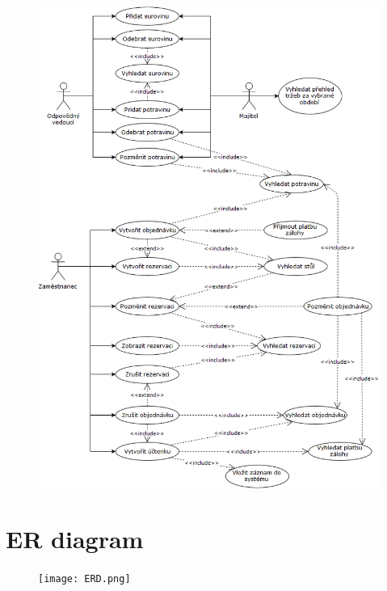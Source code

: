 \documentclass[11pt, a4paper]{article}[]
\begin{document}
	\begin{figure}[h]
	\begin{center} 
		\includegraphics[width=15cm]{use-case.png} 
		\label{fig:obr_use-case}
	\end{center}
	\end{figure}

	

	
	\section{ER diagram}

	\begin{figure}[h]
	\begin{center} 
		\texttt{[image: ERD.png]} 
		\label{fig:obr_ERD}
	\end{center}
	\end{figure}

	
\end{document}
